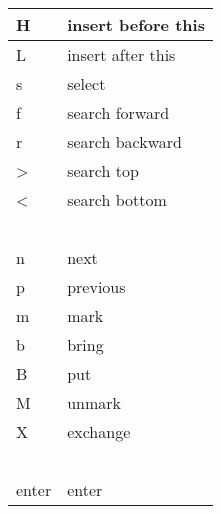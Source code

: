 \documentclass[landscape,twocolumn,letterpaper]{article}
\begin{document}
\begin{tabular}{|l|l|} \hline
       H	&    insert before this\\ \hline
       L&	    insert after this\\ \hline
       s	  &  select\\ \hline
       f	 &   search forward \\ \hline
       r	 &   search backward\\ \hline
       >	&    search top\\ \hline
       <	&    search bottom\\ \hline
 ~ & ~ \\ \hline
       n	&    next\\ \hline
       p	&    previous\\ \hline
       m&	    mark\\ \hline
       b	&    bring\\ \hline
       B	&    put\\ \hline
       M	&    unmark\\ \hline
       X	&    exchange\\ \hline
 ~ & ~ \\ \hline
       enter	 &   enter\\ \hline
 \end{tabular} 

~ \\
 
  
\end{document}
